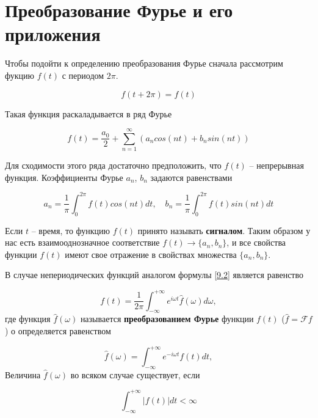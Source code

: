 \section{Преобразование Фурье и его приложения}
\label{lecture9}
Чтобы подойти к определению преобразования Фурье сначала рассмотрим фукцию $f(t)$ с периодом $2\pi$.

\begin{equation}\label{9.1}
	f(t+2\pi) = f(t)
\end{equation}

Такая функция раскаладывается в ряд Фурье 

\begin{equation}\label{9.2}
f(t) = \frac{a_0}{2} + \sum_{n = 1}^{\infty}(a_n cos(nt) + b_n sin(nt)) 
\end{equation}

Для сходимости этого ряда достаточно предположить, что $f(t)$ -- непрерывная функция.
Коэффициенты Фурье $a_n$, $b_n$ задаются равенствами

\begin{equation}\label{9.3}
a_n = \frac{1}{\pi} \int_{0}^{2\pi} f(t) cos(nt) dt,\quad b_n = \frac{1}{\pi} \int_{0}^{2\pi} f(t) sin(nt) dt
\end{equation} 

Если $t$ -- время, то функцию $f(t)$ принято называть \textbf{сигналом}. 
Таким образом у нас есть взаимооднозначное соответствие $f(t) \rightarrow \{a_n, b_n\}$, и все свойства функции $f(t)$ имеют свое отражение в свойствах множества $\{a_n, b_n\}$.

В случае непериодических функций аналогом формулы \ref{9.2} является равенство 

\begin{equation}\label{9.4}
f(t) = \frac{1}{2\pi}\int_{-\infty}^{+\infty} e^{i\omega t} \hat{f} (\omega) d\omega,
\end{equation}
где функция $\hat{f}(\omega)$ называется \textbf{преобразованием Фурье} функции $f(t)$ ($ \hat{f} = \mathscr{F} f$)
о определяется равенством 

\begin{equation}\label{9.5}
\hat{f} (\omega) = \int_{-\infty}^{+\infty} e^{-i\omega t} f(t) dt,
\end{equation}
Величина $\hat{f} (\omega)$ во всяком случае существует, если 

\begin{equation}\label{9.6}
\int_{-\infty}^{+\infty} |f(t)| dt < \infty
\end{equation}

